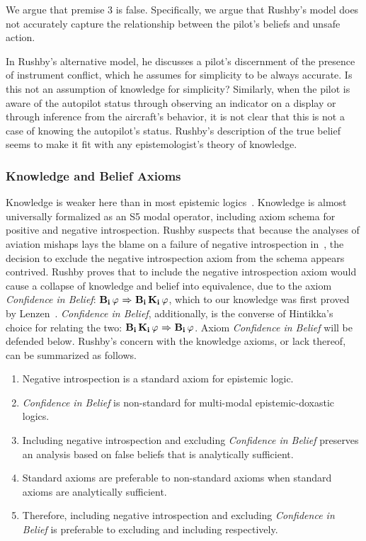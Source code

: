 We argue that premise 3 is false. Specifically, we argue that Rushby's model does not accurately capture the relationship between the pilot's beliefs and unsafe action.

In Rushby's alternative model, he discusses a pilot's discernment of the presence of instrument conflict, which he assumes for simplicity to be always accurate. Is this not an assumption of knowledge for simplicity? Similarly, when the pilot is aware of the autopilot status through observing an indicator on a display or through inference from the aircraft's behavior, it is not clear that this is not a case of knowing the autopilot's status. Rushby's description of the true belief seems to make it fit with any epistemologist's theory of knowledge. 

\subsubsection*{Knowledge and Belief Axioms}
Knowledge is weaker here than in most epistemic logics~\cite{FHMV,DEL,Hintikka}. Knowledge is almost universally formalized as an S5 modal operator, including axiom schema for positive and negative introspection. Rushby suspects that because the analyses of aviation mishaps lays the blame on a failure of negative introspection in~\cite{AhrenbachGoodloe}, the decision to exclude the negative introspection axiom from the schema appears contrived. Rushby proves that to include the negative introspection axiom would cause a collapse of knowledge and belief into equivalence, due to the axiom \emph{Confidence in Belief}: $\mathbf{B}_{\mathbf{i}}\,\varphi {\ \Rightarrow \ } \mathbf{B}_{\mathbf{i}}\,\mathbf{K}_{\mathbf{i}}\,\varphi$, which to our knowledge was first proved by Lenzen~\cite{Lenzen}. \emph{Confidence in Belief}, additionally, is the converse of Hintikka's choice for relating the two: $\mathbf{B}_{\mathbf{i}}\,\mathbf{K}_{\mathbf{i}}\,\varphi {\ \Rightarrow \ } \mathbf{B}_{\mathbf{i}}\,\varphi$. Axiom \emph{Confidence in Belief} will be defended below. Rushby's concern with the knowledge axioms, or lack thereof, can be summarized as follows.

\begin{enumerate}
	\item Negative introspection is a standard axiom for epistemic logic.
	\item \emph{Confidence in Belief} is non-standard for multi-modal epistemic-doxastic logics.
	\item Including negative introspection and excluding \emph{Confidence in Belief} preserves an analysis based on false beliefs that is analytically sufficient.
	\item Standard axioms are preferable to non-standard axioms when standard axioms are analytically sufficient.
	\item Therefore, including negative introspection and excluding \emph{Confidence in Belief} is preferable to excluding and including respectively.
\end{enumerate}


